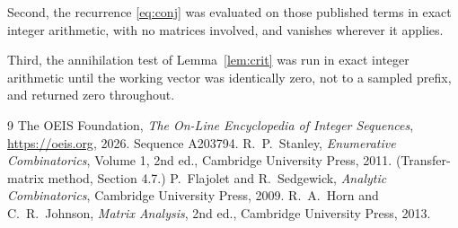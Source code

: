 \documentclass[11pt,a4paper]{article}
\theoremstyle{plain}
\theoremstyle{definition}
\begin{document}
Second, the recurrence \eqref{eq:conj} was evaluated on those published terms in exact
integer arithmetic, with no matrices involved, and vanishes wherever it applies.

Third, the annihilation test of Lemma~\ref{lem:crit} was run in exact integer arithmetic
until the working vector was identically zero, not to a sampled prefix, and returned zero
throughout.

\begin{thebibliography}{9}
 The OEIS Foundation, \emph{The On-Line Encyclopedia of Integer
Sequences}, \url{https://oeis.org}, 2026. Sequence A203794.
 R.~P.~Stanley, \emph{Enumerative Combinatorics}, Volume 1, 2nd ed.,
Cambridge University Press, 2011. (Transfer-matrix method, Section 4.7.)
 P.~Flajolet and R.~Sedgewick, \emph{Analytic Combinatorics}, Cambridge
University Press, 2009.
 R.~A.~Horn and C.~R.~Johnson, \emph{Matrix Analysis}, 2nd ed., Cambridge
University Press, 2013.
\end{thebibliography}
\end{document}
